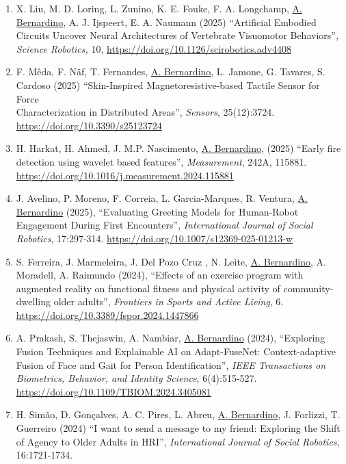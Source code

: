 \begin{enumerate}
  processing framework for water status monitoring in vineyards'',
  \emph{Computers and Electronics in Agriculture}, Volume 239, Part A,
  \url{https://doi.org/10.1016/j.compag.2025.110931}
\item
  X. Liu, M. D. Loring, L. Zunino, K. E. Fouke, F. A. Longchamp, \ul{A.
  Bernardino}, A. J. Ijspeert, E. A. Naumann (2025) ``Artificial
  Embodied Circuits Uncover Neural Architectures of Vertebrate
  Visuomotor Behaviors'', \emph{Science Robotics,} 10,
  \url{https://doi.org/10.1126/scirobotics.adv4408}
\item
  F. Mêda, F. Näf, T. Fernandes, \ul{A. Bernardino}, L. Jamone, G.
  Tavares, S. Cardoso (2025) ``Skin-Inspired Magnetoresistive-based
  Tactile Sensor for Force~\\
  Characterization in Distributed Areas'', \emph{Sensors}, 25(12):3724.
  \url{https://doi.org/10.3390/s25123724}
\item
  H. Harkat, H. Ahmed, J. M.P. Nascimento, \ul{A. Bernardino}, (2025)
  ``Early fire detection using wavelet based features'',
  \emph{Measurement}, 242A, 115881.
  \url{https://doi.org/10.1016/j.measurement.2024.115881}
\item
  J. Avelino, P. Moreno, F. Correia, L. Garcia-Marques, R. Ventura,
  \ul{A. Bernardino} (2025), ``Evaluating Greeting Models for
  Human-Robot Engagement During First Encounters'', \emph{International
  Journal of Social Robotics}, 17:297-314.
  \url{https://doi.org/10.1007/s12369-025-01213-w}
\item
  S. Ferreira, J. Marmeleira, J. Del Pozo Cruz , N. Leite, \ul{A.
  Bernardino}, A. Moradell, A. Raimundo (2024), ``Effects of an exercise
  program with augmented reality on functional fitness and physical
  activity of community-dwelling older adults'', \emph{Frontiers in
  Sports and Active Living}, 6.
  \url{https://doi.org/10.3389/fspor.2024.1447866}
\item
  A. Prakash, S. Thejaswin, A. Nambiar, \ul{A. Bernardino} (2024),
  ``Exploring Fusion Techniques and Explainable AI on Adapt-FuseNet:
  Context-adaptive Fusion of Face and Gait for Person Identification'',
  \emph{IEEE Transactions on Biometrics, Behavior, and Identity
  Science}, 6(4):515-527.
  \url{https://doi.org/10.1109/TBIOM.2024.3405081}
\item
  H. Simão, D. Gonçalves, A. C. Pires, L. Abreu, \ul{A. Bernardino}, J.
  Forlizzi, T. Guerreiro (2024) ``I want to send a message to my friend:
  Exploring the Shift of Agency to Older Adults in HRI'',
  \emph{International Journal of Social Robotics,} 16:1721-1734.

\end{enumerate}
